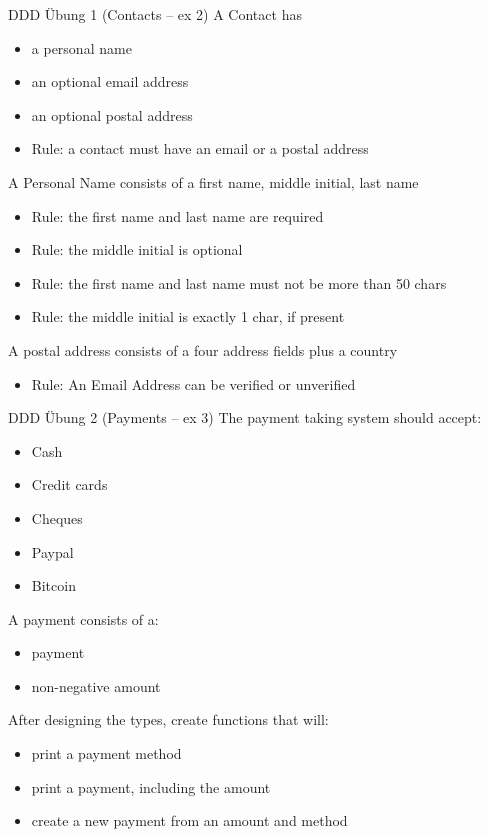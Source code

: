 \documentclass[t]{beamer}
\begin{document}
\begin{frame}[label={sec:orgf747148}]{DDD Übung 1 (Contacts -- ex 2)}
A Contact has

\begin{itemize}
\item a personal name
\item an optional email address
\item an optional postal address
\item Rule: a contact must have an email or a postal address
\end{itemize}

A Personal Name consists of a first name, middle initial, last name

\begin{itemize}
\item Rule: the first name and last name are required
\item Rule: the middle initial is optional
\item Rule: the first name and last name must not be more than 50 chars
\item Rule: the middle initial is exactly 1 char, if present
\end{itemize}

A postal address consists of a four address fields plus a country

\begin{itemize}
\item Rule: An Email Address can be verified or unverified
\end{itemize}
\end{frame}

\begin{frame}[label={sec:orgd8845cf}]{DDD Übung 2 (Payments -- ex 3)}
The payment taking system should accept:

\begin{itemize}
\item Cash
\item Credit cards
\item Cheques
\item Paypal
\item Bitcoin
\end{itemize}

A payment consists of a:

\begin{itemize}
\item payment
\item non-negative amount
\end{itemize}

After designing the types, create functions that will:

\begin{itemize}
\item print a payment method
\item print a payment, including the amount
\item create a new payment from an amount and method
\end{itemize}
\end{frame}
\end{document}
